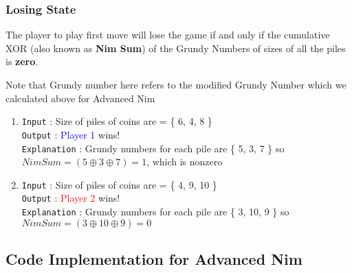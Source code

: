 \documentclass[11pt]{article}
\begin{document}
\subsubsection{Losing State}
\begin{properties}
The player to play first move will lose the game if and only if the cumulative XOR (also known as \textbf{Nim Sum}) of the Grundy Numbers of sizes of all the piles is \textbf{zero}. 
\end{properties}

\begin{remark}
    Note that Grundy number here refers to the modified Grundy Number which we calculated above for Advanced Nim
\end{remark}

\begin{example}
    \begin{enumerate}
        \item \texttt{Input} : Size of piles of coins are = \{ 6, 4, 8 \} \\ \texttt{Output} : \textcolor{blue}{Player 1} wins! \\ \texttt{Explanation} : Grundy numbers for each pile are \{ 5, 3, 7 \} so  $NimSum = (5 \oplus 3 \oplus 7) = 1$, which is nonzero
        \item \texttt{Input} : Size of piles of coins are = \{ 4, 9, 10 \} \\ \texttt{Output} : \textcolor{red}{Player 2} wins! \\ \texttt{Explanation} : Grundy numbers for each pile are \{ 3, 10, 9 \} so  $NimSum = (3 \oplus 10 \oplus 9) = 0$
    \end{enumerate}
\end{example}

\subsection{Code Implementation for Advanced Nim}
\end{document}
